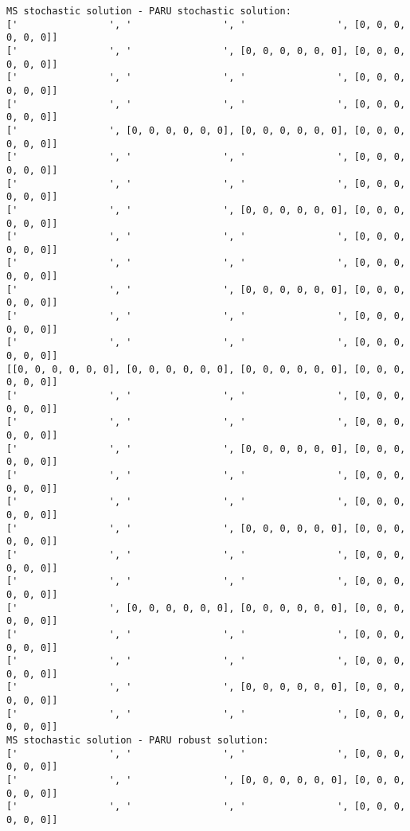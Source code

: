\documentclass[10pt]{article}
\theoremstyle{plain}
\theoremstyle{definition}
\theoremstyle{remark}
\begin{document}
\begin{minipage}[t]{8cm}
\tiny
\begin{verbatim}
MS stochastic solution - PARU stochastic solution:
['                ', '                ', '                ', [0, 0, 0, 0, 0, 0]]
['                ', '                ', [0, 0, 0, 0, 0, 0], [0, 0, 0, 0, 0, 0]]
['                ', '                ', '                ', [0, 0, 0, 0, 0, 0]]
['                ', '                ', '                ', [0, 0, 0, 0, 0, 0]]
['                ', [0, 0, 0, 0, 0, 0], [0, 0, 0, 0, 0, 0], [0, 0, 0, 0, 0, 0]]
['                ', '                ', '                ', [0, 0, 0, 0, 0, 0]]
['                ', '                ', '                ', [0, 0, 0, 0, 0, 0]]
['                ', '                ', [0, 0, 0, 0, 0, 0], [0, 0, 0, 0, 0, 0]]
['                ', '                ', '                ', [0, 0, 0, 0, 0, 0]]
['                ', '                ', '                ', [0, 0, 0, 0, 0, 0]]
['                ', '                ', [0, 0, 0, 0, 0, 0], [0, 0, 0, 0, 0, 0]]
['                ', '                ', '                ', [0, 0, 0, 0, 0, 0]]
['                ', '                ', '                ', [0, 0, 0, 0, 0, 0]]
[[0, 0, 0, 0, 0, 0], [0, 0, 0, 0, 0, 0], [0, 0, 0, 0, 0, 0], [0, 0, 0, 0, 0, 0]]
['                ', '                ', '                ', [0, 0, 0, 0, 0, 0]]
['                ', '                ', '                ', [0, 0, 0, 0, 0, 0]]
['                ', '                ', [0, 0, 0, 0, 0, 0], [0, 0, 0, 0, 0, 0]]
['                ', '                ', '                ', [0, 0, 0, 0, 0, 0]]
['                ', '                ', '                ', [0, 0, 0, 0, 0, 0]]
['                ', '                ', [0, 0, 0, 0, 0, 0], [0, 0, 0, 0, 0, 0]]
['                ', '                ', '                ', [0, 0, 0, 0, 0, 0]]
['                ', '                ', '                ', [0, 0, 0, 0, 0, 0]]
['                ', [0, 0, 0, 0, 0, 0], [0, 0, 0, 0, 0, 0], [0, 0, 0, 0, 0, 0]]
['                ', '                ', '                ', [0, 0, 0, 0, 0, 0]]
['                ', '                ', '                ', [0, 0, 0, 0, 0, 0]]
['                ', '                ', [0, 0, 0, 0, 0, 0], [0, 0, 0, 0, 0, 0]]
['                ', '                ', '                ', [0, 0, 0, 0, 0, 0]]
MS stochastic solution - PARU robust solution:
['                ', '                ', '                ', [0, 0, 0, 0, 0, 0]]
['                ', '                ', [0, 0, 0, 0, 0, 0], [0, 0, 0, 0, 0, 0]]
['                ', '                ', '                ', [0, 0, 0, 0, 0, 0]]

\end{verbatim}
\end{minipage}
\end{document}

